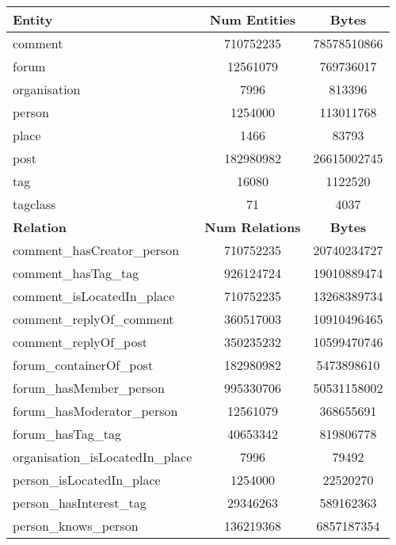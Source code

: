 \begin{table}[H]
    \centering
    \begin{tabular} {| l | c | c |}
        \hline
        \textbf{Entity} & \textbf{Num Entities} & \textbf{Bytes} \\
        \hline
        \hline
        comment & 710752235 & 78578510866 \\
        \hline
        forum & 12561079 & 769736017 \\
        \hline
        organisation & 7996 & 813396 \\
        \hline
        person & 1254000 & 113011768 \\
        \hline
        place & 1466 & 83793 \\
        \hline
        post & 182980982 & 26615002745 \\
        \hline
        tag & 16080 & 1122520 \\
        \hline
        tagclass & 71 & 4037 \\
        \hline
        \hline
        \textbf{Relation} & \textbf{Num Relations} & \textbf{Bytes} \\
        \hline
        \hline
        comment\_hasCreator\_person & 710752235 & 20740234727 \\
        \hline
        comment\_hasTag\_tag & 926124724 & 19010889474 \\
        \hline
        comment\_isLocatedIn\_place & 710752235 & 13268389734 \\
        \hline
        comment\_replyOf\_comment & 360517003 & 10910496465 \\
        \hline
        comment\_replyOf\_post & 350235232 & 10599470746 \\
        \hline
        forum\_containerOf\_post & 182980982 & 5473898610 \\
        \hline
        forum\_hasMember\_person & 995330706 & 50531158002 \\
        \hline
        forum\_hasModerator\_person & 12561079 & 368655691 \\
        \hline
        forum\_hasTag\_tag & 40653342 & 819806778 \\
        \hline
        organisation\_isLocatedIn\_place & 7996 & 79492 \\
        \hline
        person\_isLocatedIn\_place & 1254000 & 22520270 \\
        \hline
        person\_hasInterest\_tag & 29346263 & 589162363 \\
        \hline
        person\_knows\_person & 136219368 & 6857187354 \\

\end{tabular}
\end{table}
